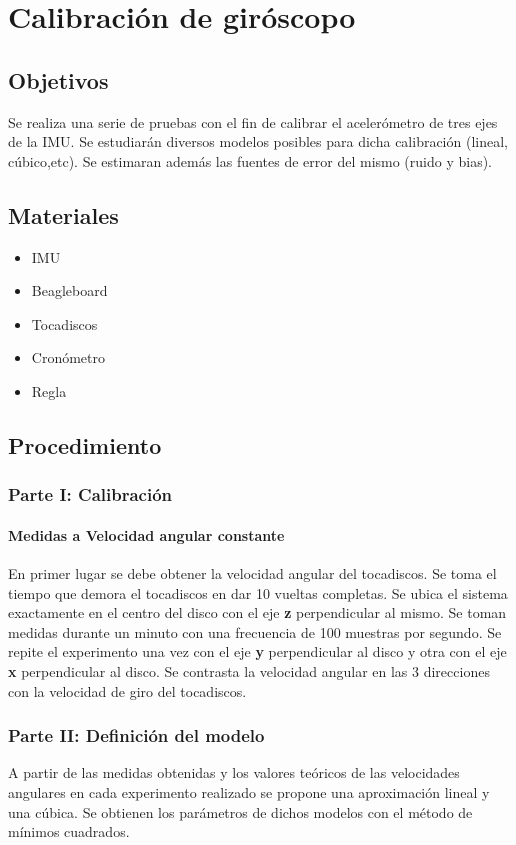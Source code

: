 \documentclass[spanish,12pt,a4paper,titlepage]{report}
\begin{document}
\chapter{Calibración de giróscopo}

\section{Objetivos}

Se realiza una serie de pruebas con el fin de calibrar el acelerómetro de tres ejes de la IMU. Se estudiarán diversos modelos posibles para dicha calibración (lineal, cúbico,etc). Se estimaran además las fuentes de error del mismo (ruido y bias).

\section{Materiales}
\begin{itemize}
\item IMU
\item Beagleboard
\item Tocadiscos
\item Cronómetro
\item Regla
\end{itemize}
\section{Procedimiento}

\subsection{Parte I: Calibración}

\subsubsection*{Medidas a Velocidad angular constante}
En primer lugar se debe obtener la velocidad angular del tocadiscos. Se toma el tiempo que demora el tocadiscos en dar 10 vueltas completas. Se ubica el sistema exactamente en el centro del disco con el eje \textbf{z} perpendicular al mismo. Se toman medidas durante un minuto con una frecuencia de 100 muestras por segundo. Se repite el experimento una vez con el eje \textbf{y} perpendicular al disco y otra con el eje \textbf{x} perpendicular al disco. Se contrasta la velocidad angular en las 3 direcciones con la velocidad de giro del tocadiscos.

\subsection{Parte II: Definición del modelo}
A partir de las medidas obtenidas y los valores teóricos de las velocidades angulares en cada experimento realizado se propone una aproximación lineal y una cúbica. Se obtienen los parámetros de dichos modelos con el método de mínimos cuadrados.\\
\end{document}
